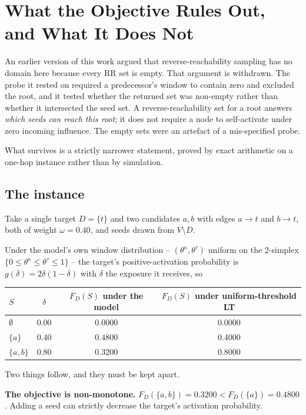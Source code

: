 \section{What the Objective Rules Out, and What It Does Not}
\label{sec:coverage}

An earlier version of this work argued that reverse-reachability sampling has no domain here
because every RR set is empty.  That argument is withdrawn.  The probe it rested on required a
predecessor's window to contain zero and excluded the root, and it tested whether the returned set
was non-empty rather than whether it intersected the seed set.  A reverse-reachability set for a
root answers \emph{which seeds can reach this root}; it does not require a node to self-activate
under zero incoming influence.  The empty sets were an artefact of a mis-specified probe.

What survives is a strictly narrower statement, proved by exact arithmetic on a one-hop instance
rather than by simulation.

\subsection{The instance}

Take a single target $D = \{t\}$ and two candidates $a, b$ with edges $a \to t$ and $b \to t$,
both of weight $\omega = 0.40$, and seeds drawn from $V \setminus D$.

Under the model's own window distribution -- $(\theta^\kappa, \theta^\tau)$ uniform on the
2-simplex $\{0 \le \theta^\kappa \le \theta^\tau \le 1\}$ -- the target's positive-activation
probability is $g(\delta) = 2\delta(1-\delta)$ with $\delta$ the exposure it receives, so

\begin{center}
\begin{tabular}{lccc}
\toprule
$S$ & $\delta$ & $F_D(S)$ under the model & $F_D(S)$ under uniform-threshold LT \\
\midrule
$\emptyset$   & $0.00$ & $0.0000$ & $0.0000$ \\
$\{a\}$       & $0.40$ & $0.4800$ & $0.4000$ \\
$\{a,b\}$     & $0.80$ & $0.3200$ & $0.8000$ \\
\bottomrule
\end{tabular}
\end{center}

Two things follow, and they must be kept apart.

\textbf{The objective is non-monotone.} $F_D(\{a,b\}) = 0.3200 < F_D(\{a\}) = 0.4800$.
Adding a seed can strictly decrease the target's activation probability.

